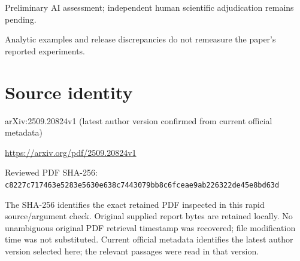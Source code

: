 \documentclass[11pt]{article}
\begin{document}
Preliminary AI assessment; independent human scientific adjudication remains pending.\par

Analytic examples and release discrepancies do not remeasure the paper’s reported experiments.\par

\section*{Source identity}

arXiv:2509.20824v1 (latest author version confirmed from current official metadata)

\url{https://arxiv.org/pdf/2509.20824v1}

Reviewed PDF SHA-256: \nolinkurl{c8227c717463e5283e5630e638c7443079bb8c6fceae9ab226322de45e8bd63d}

The SHA-256 identifies the exact retained PDF inspected in this rapid source/argument check. Original supplied report bytes are retained locally. No unambiguous original PDF retrieval timestamp was recovered; file modification time was not substituted. Current official metadata identifies the latest author version selected here; the relevant passages were read in that version.
\end{document}
